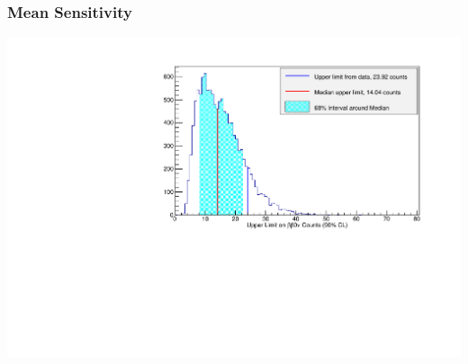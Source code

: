 \documentclass{beamer}
\begin{document}
\begin{frame}
\begin{center}
\frametitle{Mean Sensitivity}
\end{center}
\vspace{0.6cm}
\begin{center}
\includegraphics[keepaspectratio=true,width=\textwidth]{toy_mc_sensitivity.pdf}
\end{center}
\end{frame}
\end{document}

